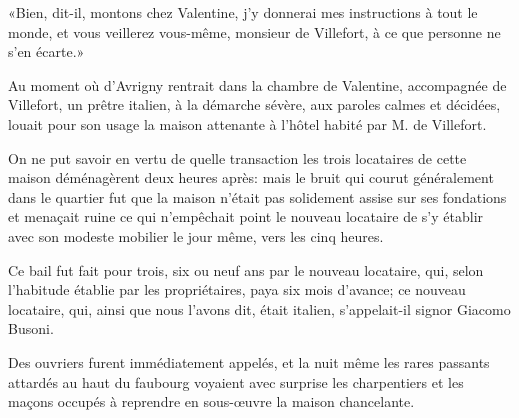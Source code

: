 «Bien, dit-il, montons chez Valentine, j'y donnerai mes instructions à tout le monde, et vous veillerez vous-même, monsieur de Villefort, à ce que personne ne s'en écarte.» 

Au moment où d'Avrigny rentrait dans la chambre de Valentine, accompagnée de Villefort, un prêtre italien, à la démarche sévère, aux paroles calmes et décidées, louait pour son usage la maison attenante à l'hôtel habité par M. de Villefort. 

On ne put savoir en vertu de quelle transaction les trois locataires de cette maison déménagèrent deux heures après: mais le bruit qui courut généralement dans le quartier fut que la maison n'était pas solidement assise sur ses fondations et menaçait ruine ce qui n'empêchait point le nouveau locataire de s'y établir avec son modeste mobilier le jour même, vers les cinq heures. 

Ce bail fut fait pour trois, six ou neuf ans par le nouveau locataire, qui, selon l'habitude établie par les propriétaires, paya six mois d'avance; ce nouveau locataire, qui, ainsi que nous l'avons dit, était italien, s'appelait-il signor Giacomo Busoni. 

Des ouvriers furent immédiatement appelés, et la nuit même les rares passants attardés au haut du faubourg voyaient avec surprise les charpentiers et les maçons occupés à reprendre en sous-œuvre la maison chancelante. 